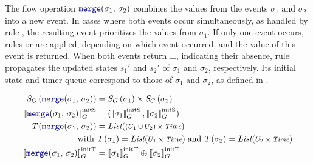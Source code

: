 The flow operation $\mergeop{\sigma_1}{\sigma_2}$ combines the values from the events $\sigma_1$ and
$\sigma_2$ into a new event. In cases where both events occur simultaneously, as handled by rule
, the resulting event prioritizes the values from
$\sigma_1$. If only one event occurs, rules  or
 are applied, depending on which event occurred, and
the value of this event is returned. When both events return $\bot$, indicating their absence, rule
 propagates the updated states $s_1'$ and $s_2'$
of $\sigma_1$ and $\sigma_2$, respectively. Its initial state and timer queue correspond to those of
$\sigma_1$ and $\sigma_2$, as defined in .

\begin{align}
    \stateTy{\mergeop{\sigma_1}{\sigma_2}}   & = \stateTy{\sigma_1} \times \stateTy{\sigma_2} \label{eq:semantics:grfrp:opsem:stateTy:op:merge}                     \\
    \initstate{\mergeop{\sigma_1}{\sigma_2}} & = (\initstate{\sigma_1}, \initstate{\sigma_2}) \label{eq:semantics:grfrp:opsem:init:op:merge:state}                  \\
    \timerTy{\mergeop{\sigma_1}{\sigma_2}}   & = \List{(U_1 \cup U_2) \times \Time} \label{eq:semantics:grfrp:opsem:timerTy:op:merge}                               \\
    \text{with} \;                           & \timerTy{\sigma_1} = \List{U_1 \times \Time} \; \text{and} \; \timerTy{\sigma_2} = \List{U_2 \times \Time} \nonumber \\
    \inittimer{\mergeop{\sigma_1}{\sigma_2}} & = \inittimer{\sigma_1} \lstconcat \inittimer{\sigma_2} \label{eq:semantics:grfrp:opsem:init:op:merge:timer}
\end{align}

